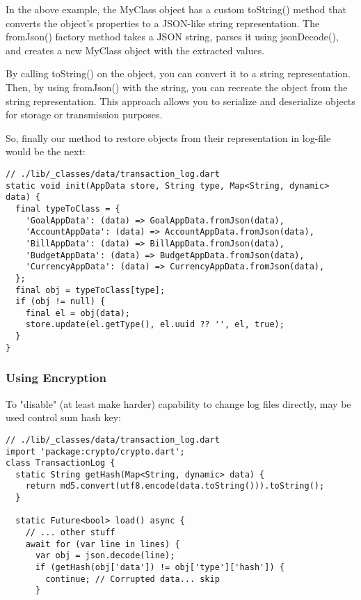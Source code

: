 In the above example, the MyClass object has a custom toString() method that converts the object's properties to a 
JSON-like string representation. The fromJson() factory method takes a JSON string, parses it using jsonDecode(), 
and creates a new MyClass object with the extracted values.

By calling toString() on the object, you can convert it to a string representation. Then, by using fromJson() with the 
string, you can recreate the object from the string representation. This approach allows you to serialize and 
deserialize objects for storage or transmission purposes.

So, finally our method to restore objects from their representation in log-file would be the next:

\begin{lstlisting}[firstnumber=54]
// ./lib/_classes/data/transaction_log.dart
static void init(AppData store, String type, Map<String, dynamic> data) {
  final typeToClass = {
    'GoalAppData': (data) => GoalAppData.fromJson(data),
    'AccountAppData': (data) => AccountAppData.fromJson(data),
    'BillAppData': (data) => BillAppData.fromJson(data),
    'BudgetAppData': (data) => BudgetAppData.fromJson(data),
    'CurrencyAppData': (data) => CurrencyAppData.fromJson(data),
  };
  final obj = typeToClass[type];
  if (obj != null) {
    final el = obj(data);
    store.update(el.getType(), el.uuid ?? '', el, true);
  }
}
\end{lstlisting}



\subsubsection{Using Encryption}

To "disable" (at least make harder) capability to change log files directly, may be used control sum hash key:

\begin{lstlisting}
// ./lib/_classes/data/transaction_log.dart
import 'package:crypto/crypto.dart';
class TransactionLog {
  static String getHash(Map<String, dynamic> data) {
    return md5.convert(utf8.encode(data.toString())).toString();
  }

  static Future<bool> load() async {
    // ... other stuff
    await for (var line in lines) {
      var obj = json.decode(line);
      if (getHash(obj['data']) != obj['type']['hash']) {
        continue; // Corrupted data... skip
      }
\end{lstlisting}

